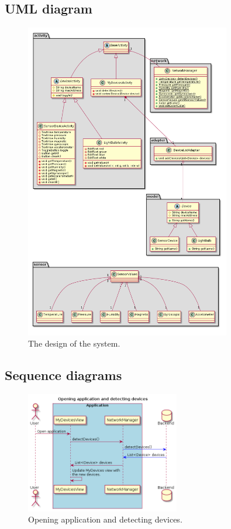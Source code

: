 \documentclass[a4paper]{article}
\begin{document}
\subsection{UML diagram}
	\begin{figure}[H]
    \centering
    \includegraphics[width=0.8\textwidth]{class_diagram.png}
    \caption{The design of the system.}
    \label{fig:seq}
\end{figure}

	
	\subsection{Sequence diagrams}
	
	\begin{figure}[H]
    \centering
    \includegraphics[width=0.6\textwidth]{seq.png}
    \caption{Opening application and detecting devices.}
    \label{fig:seq}
\end{figure}
\end{document}

